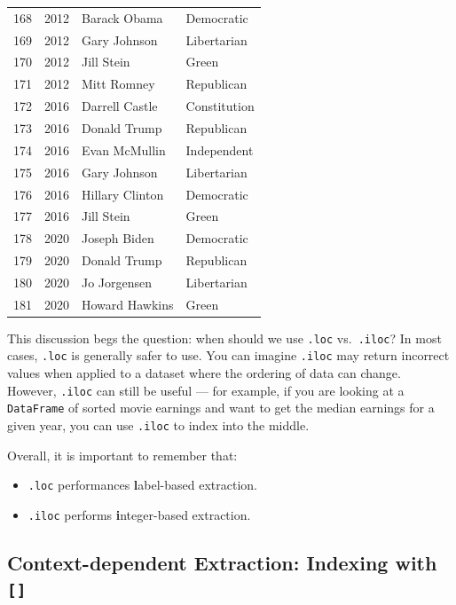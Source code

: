 \documentclass[
  letterpaper,
  DIV=11,
  numbers=noendperiod]{scrreprt}
\providecommand{\tightlist}{%
  \setlength{\itemsep}{0pt}\setlength{\parskip}{0pt}}\usepackage{longtable,booktabs,array}
\begin{document}
\begin{tabular}{lrll}
168 &  2012 &            Barack Obama &             Democratic \\
169 &  2012 &            Gary Johnson &            Libertarian \\
170 &  2012 &              Jill Stein &                  Green \\
171 &  2012 &             Mitt Romney &             Republican \\
172 &  2016 &          Darrell Castle &           Constitution \\
173 &  2016 &            Donald Trump &             Republican \\
174 &  2016 &           Evan McMullin &            Independent \\
175 &  2016 &            Gary Johnson &            Libertarian \\
176 &  2016 &         Hillary Clinton &             Democratic \\
177 &  2016 &              Jill Stein &                  Green \\
178 &  2020 &            Joseph Biden &             Democratic \\
179 &  2020 &            Donald Trump &             Republican \\
180 &  2020 &            Jo Jorgensen &            Libertarian \\
181 &  2020 &          Howard Hawkins &                  Green \\
\bottomrule
\end{tabular}

This discussion begs the question: when should we use \texttt{.loc}
vs.~\texttt{.iloc}? In most cases, \texttt{.loc} is generally safer to
use. You can imagine \texttt{.iloc} may return incorrect values when
applied to a dataset where the ordering of data can change. However,
\texttt{.iloc} can still be useful --- for example, if you are looking
at a \texttt{DataFrame} of sorted movie earnings and want to get the
median earnings for a given year, you can use \texttt{.iloc} to index
into the middle.

Overall, it is important to remember that:

\begin{itemize}
\tightlist
\item
  \texttt{.loc} performances \textbf{l}abel-based extraction.
\item
  \texttt{.iloc} performs \textbf{i}nteger-based extraction.
\end{itemize}

\hypertarget{context-dependent-extraction-indexing-with}{%
\subsection{\texorpdfstring{Context-dependent Extraction: Indexing with
\texttt{{[}{]}}}{Context-dependent Extraction: Indexing with {[}{]}}}\label{context-dependent-extraction-indexing-with}}
\end{document}
